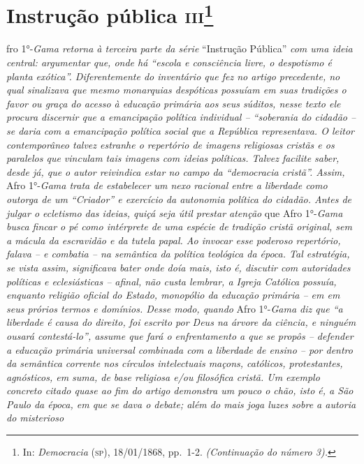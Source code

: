 \chapter{Instrução pública \textsc{iii}\footnote{In: \emph{Democracia} (\textsc{sp}),
  18/01/1868, pp.~1-2. \emph{(Continuação do número 3).}}}

\begin{didascalia}
fro 1°-\emph{Gama retorna à terceira parte da série} ``Instrução Pública''
\emph{com uma ideia central: argumentar que, onde há ``escola e
consciência livre, o despotismo é planta exótica''. Diferentemente do
inventário que fez no artigo precedente, no qual sinalizava que mesmo
monarquias despóticas possuíam em suas tradições o favor ou graça do
acesso à educação primária aos seus súditos, nesse texto ele procura
discernir que a emancipação política individual -- ``soberania do cidadão
-- se daria com a emancipação política social que a República
representava. O leitor contemporâneo talvez estranhe o repertório de
imagens religiosas cristãs e os paralelos que vinculam tais imagens com
ideias políticas. Talvez facilite saber, desde já, que o autor
reivindica estar no campo da ``democracia cristã''. Assim,} Afro
1°-\emph{Gama trata de estabelecer um nexo racional entre a liberdade
como outorga de um ``Criador'' e exercício da autonomia política do
cidadão. Antes de julgar o ecletismo das ideias, quiçá seja útil prestar
atenção} que Afro 1°-\emph{Gama busca fincar o pé como intérprete de uma
espécie de tradição cristã original, sem a mácula da escravidão e da
tutela papal. Ao invocar esse poderoso repertório, falava -- e combatia
-- na semântica da política teológica da época. Tal estratégia, se vista
assim, significava bater onde doía mais, isto é, discutir com
autoridades políticas e eclesiásticas -- afinal, não custa lembrar, a
Igreja Católica possuía, enquanto religião oficial do Estado, monopólio
da educação primária -- em em seus prórios termos e domínios. Desse
modo, quando} Afro 1°-\emph{Gama diz que ``a liberdade é causa do
direito, foi escrito por Deus na árvore da ciência, e ninguém ousará
contestá-lo'', assume que fará o enfrentamento a que se propôs --
defender a educação primária universal combinada com a liberdade de
ensino -- por dentro da semântica corrente nos círculos intelectuais
maçons, católicos, protestantes, agnósticos, em suma, de base religiosa
e/ou filosófica cristã. Um exemplo concreto citado quase ao fim do
artigo demonstra um pouco o chão, isto é, a São Paulo da época, em que
se dava o debate; além do mais joga luzes sobre a autoria do misterioso}

\end{didascalia}
